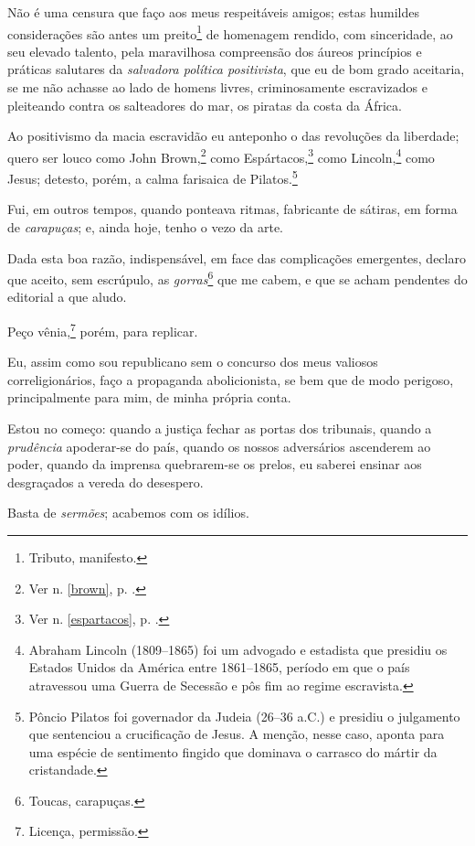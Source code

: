 Não é uma censura que faço aos meus respeitáveis amigos; estas humildes
considerações são antes um preito\footnote{Tributo, manifesto.} de
homenagem rendido, com sinceridade, ao seu elevado talento, pela
maravilhosa compreensão dos áureos princípios e práticas salutares da
\emph{salvadora política positivista}, que eu de bom grado aceitaria, se
me não achasse ao lado de homens livres, criminosamente escravizados e
pleiteando contra os salteadores do mar, os piratas da costa da África.

Ao positivismo da macia escravidão eu anteponho o das revoluções da
liberdade; quero ser louco como John
Brown,\footnote{Ver n. \ref{brown}, p. \pageref{brown}.} como
Espártacos,\footnote{Ver n. \ref{espartacos}, p. \pageref{espartacos}.} como Lincoln,\footnote{Abraham Lincoln (1809--1865) foi
  um advogado e estadista que presidiu os Estados Unidos da América
  entre 1861--1865, período em que o país atravessou uma Guerra de
  Secessão e pôs fim ao regime escravista.} como Jesus; detesto, porém,
a calma farisaica de Pilatos.\footnote{Pôncio Pilatos foi governador
  da Judeia (26--36 a.C.) e presidiu o julgamento que sentenciou a
  crucificação de Jesus. A menção, nesse caso, aponta para uma espécie
  de sentimento fingido que dominava o carrasco do mártir da
  cristandade.}

Fui, em outros tempos, quando ponteava ritmas, fabricante de sátiras, em
forma de \emph{carapuças}; e, ainda hoje, tenho o vezo da arte.

Dada esta boa razão, indispensável, em face das complicações emergentes,
declaro que aceito, sem escrúpulo, as \emph{gorras}\footnote{Toucas,
  carapuças.} que me cabem, e que se acham pendentes do editorial a que
aludo.

Peço vênia,\footnote{Licença, permissão.} porém, para replicar.

Eu, assim como sou republicano sem o concurso dos meus valiosos
correligionários, faço a propaganda abolicionista, se bem que de modo
perigoso, principalmente para mim, de minha própria conta.

Estou no começo: quando a justiça fechar as portas dos tribunais, quando
a \emph{prudência} apoderar-se do país, quando os nossos adversários
ascenderem ao poder, quando da imprensa quebrarem-se os prelos, eu
saberei ensinar aos desgraçados a vereda do desespero.

Basta de \emph{sermões}; acabemos com os idílios.

